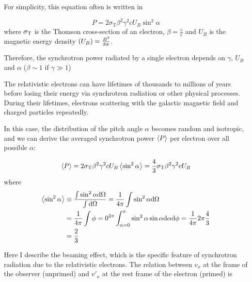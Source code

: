 For simplicity, this equation often is written in

\begin{equation}\label{eq:essential_radio5n37}
    P=2 \sigma_{\mathrm{T}} \beta^{2} \gamma^{2} c U_{B} \sin ^{2} \alpha
\end{equation}
where $\sigma_{\mathrm{T}}$ is the Thomson cross-section of an electron, $\beta=\frac{v}{c}$ and $U_B$ is the magnetic energy density $\left(U_B\right) = \frac{B^2}{8\pi}$.

Therefore, the synchrotron power radiated by a single electron depends on $\gamma$, $U_B$ and $\alpha$ ($\beta\sim1$ if $\gamma \gg 1$)

The relativistic electrons can have lifetimes of thousands to millions of years before losing their energy via synchrotron radiation or other physical processes.
During their lifetimes, electrons scattering with the galactic magnetic field and charged particles repeatedly.

In this case, the distribution of the pitch angle $\alpha$ becomes random and isotropic, and we can derive the averaged synchrotron power $\left\langle P\right\rangle$ per electron over all possible $\alpha$:

\begin{equation}\label{eq:essential_radio5n38}
    \left\langle P\right\rangle = 2 \sigma_{\mathrm{T}} \beta^2 \gamma^2 c U_B\left\langle\sin^2 \alpha\right\rangle = \frac{4}{3}\sigma_{\mathrm{T}} \beta^2 \gamma^2 c U_B
\end{equation}
where
\begin{equation}\label{eq:essential_radio5n39}
    \begin{aligned}
    \left\langle\sin^2 \alpha\right\rangle & \equiv \frac{\int \sin^2 \alpha \mathrm{d} \Omega}{\int \mathrm{d} \Omega}=\frac{1}{4\pi} \int \sin^2 \alpha \mathrm{d} \Omega \\
                        &=\frac{1}{4\pi} \int {\phi=0}^{2\pi} \int_{\alpha=0}^{\pi} \sin^2 \alpha \sin \alpha \mathrm{d} \alpha \mathrm{d} \phi=\frac{1}{4\pi} 2 \pi \frac{4}{3} \\
                        &=\frac{2}{3}
    \end{aligned}
\end{equation}

Here I describe the beaming effect, which is the specific feature of synchrotron radiation due to the relativistic electrons.
The relation between $v_x$ at the frame of the observer (unprimed) and $v'_x$  at the rest frame of the electron (primed) is

